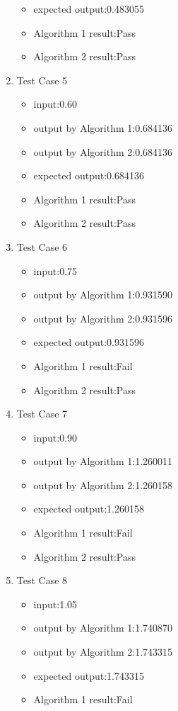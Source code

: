 \documentclass[10pt,a4paper,twoside]{article}
\begin{document}
\begin{enumerate}
\begin{itemize}
    \item expected output:0.483055
    \item Algorithm 1 result:Pass
    \item Algorithm 2 result:Pass
\end{itemize}
\item 
Test Case 5
\begin{itemize}
    \item input:0.60
    \item output by Algorithm 1:0.684136
    \item output by Algorithm 2:0.684136
    \item expected output:0.684136
    \item Algorithm 1 result:Pass
    \item Algorithm 2 result:Pass
\end{itemize}
\item 
Test Case 6
\begin{itemize}
    \item input:0.75
    \item output by Algorithm 1:0.931590
    \item output by Algorithm 2:0.931596
    \item expected output:0.931596
    \item Algorithm 1 result:Fail
    \item Algorithm 2 result:Pass
\end{itemize}
\item 
Test Case 7
\begin{itemize}
    \item input:0.90
    \item output by Algorithm 1:1.260011
    \item output by Algorithm 2:1.260158
    \item expected output:1.260158
    \item Algorithm 1 result:Fail
    \item Algorithm 2 result:Pass
\end{itemize}
\item 
Test Case 8
\begin{itemize}
    \item input:1.05
    \item output by Algorithm 1:1.740870
    \item output by Algorithm 2:1.743315
    \item expected output:1.743315
    \item Algorithm 1 result:Fail

\end{itemize}
\end{enumerate}
\end{document}
